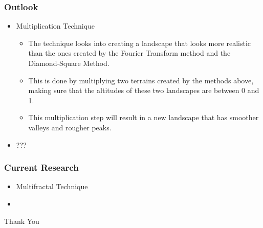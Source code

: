 \documentclass{beamer}
\begin{document}
  \begin{frame}
  \frametitle{Outlook}
  \begin{itemize}
    \item Multiplication Technique
    \begin{itemize}
    \item The technique looks into creating a landscape that looks more realistic than the ones created by the Fourier Transform method and the Diamond-Square Method.
    \item This is done by multiplying two terrains created by the methods above, making sure that the altitudes of these two landscapes are between 0 and 1. 
    \item This multiplication step will result in a new landscape that has smoother valleys and rougher peaks.
    \end{itemize}
    \item ???
    \end{itemize}
\end{frame}

\begin{frame}
 \frametitle{Current Research}
\begin{itemize}
 \item Multifractal Technique
\item 
\end{itemize}
\end{frame}




\begin{frame}
 Thank You
\end{frame}


\end{document}
